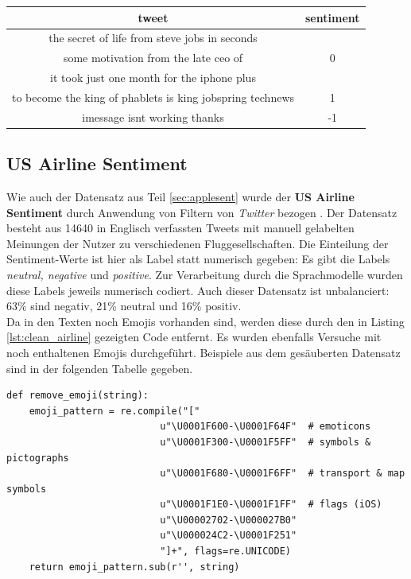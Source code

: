 \begin{center}
\begin{tabular}{|c|c|}
\hline
tweet & sentiment\\ 
\hline\hline
the secret of life from steve jobs in    seconds& \\ some motivation from the late ceo of&0\\
\hline
it took just one month for the iphone plus& \\to become the king of phablets  is king  jobspring technews&1\\
\hline
imessage isnt working thanks&-1\\
\hline    
\end{tabular}
\end{center}


\subsection{US Airline Sentiment}
\label{sec:airlinesent}
Wie auch der Datensatz aus Teil \ref{sec:applesent} wurde der \textbf{US Airline Sentiment} durch Anwendung von Filtern von \textit{Twitter} bezogen \cite{airlines}. Der Datensatz besteht aus 14640 in Englisch verfassten Tweets mit manuell gelabelten Meinungen der Nutzer zu verschiedenen Fluggesellschaften. Die Einteilung der Sentiment-Werte ist hier als Label statt numerisch gegeben: Es gibt die Labels \textit{neutral, negative} und \textit{positive}. Zur Verarbeitung durch die Sprachmodelle wurden diese Labels jeweils numerisch codiert. Auch dieser Datensatz ist unbalanciert: 63\% sind negativ, 21\% neutral und 16\% positiv.\\
Da in den Texten noch Emojis vorhanden sind, werden diese durch den in Listing \ref{lst:clean_airline} gezeigten Code entfernt. Es wurden ebenfalls Versuche mit noch enthaltenen Emojis durchgef\"uhrt. Beispiele aus dem ges\"auberten Datensatz sind in der folgenden Tabelle gegeben.
\lstset{language=Python}
\lstset{frame=lines}
\lstset{captionpos=b}
\lstset{basicstyle=\footnotesize}
\begin{lstlisting}
def remove_emoji(string):
    emoji_pattern = re.compile("["
                           u"\U0001F600-\U0001F64F"  # emoticons
                           u"\U0001F300-\U0001F5FF"  # symbols & pictographs
                           u"\U0001F680-\U0001F6FF"  # transport & map symbols
                           u"\U0001F1E0-\U0001F1FF"  # flags (iOS)
                           u"\U00002702-\U000027B0"
                           u"\U000024C2-\U0001F251"
                           "]+", flags=re.UNICODE)
    return emoji_pattern.sub(r'', string)
\end{lstlisting}
